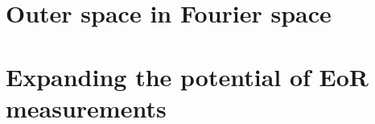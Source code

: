 \documentclass[12pt,twoside,openany]{book}
\begin{document}
\part{Outer space in Fourier space}

%
%
%

%
%

%
%

% 
%

%
%

%
%

%
%
\part{Expanding the potential of EoR measurements}




%
%


\begin{appendices}


\end{appendices}

\newpage
%



\end{document}
